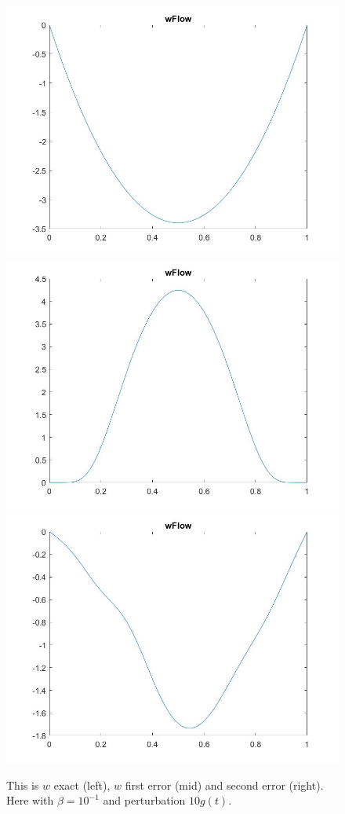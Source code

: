 \documentclass[11pt, a4paper]{article}
\theoremstyle{definition}
\begin{document}
\begin{figure}[h]
	\includegraphics[scale=0.3]{linDwexact1.jpg}
	\includegraphics[scale=0.3]{linDwerr1.jpg}
	\includegraphics[scale=0.3]{linDwerr2.jpg}
	\caption{This is $w$ exact (left), $w$ first error (mid) and second error (right). Here with $\beta =10^{-1}$ and perturbation $10g(t)$.}
	\label{Figlint4a}
\end{figure}
\end{document}
